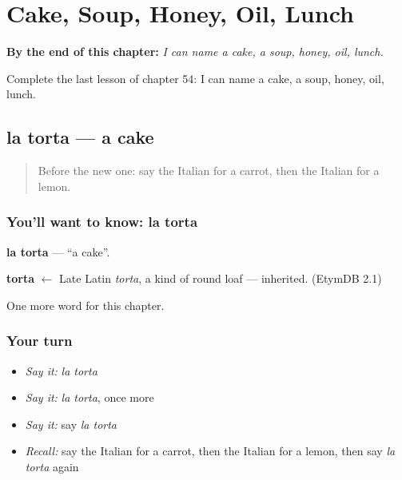 
\chapter{Cake, Soup, Honey, Oil, Lunch}
\label{ch:it-cake-soup-honey-oil-lunch}

\begin{chapteropening}
\textbf{By the end of this chapter:} \emph{I can name a cake, a soup, honey, oil, lunch.}

Complete the last lesson of chapter 54: I can name a cake, a soup, honey, oil, lunch.
\end{chapteropening}

\section[la torta]{la torta — a cake}

\label{lesson:IT-C54-torta}



\begin{quote}
Before the new one: say the Italian for a carrot, then the Italian for a lemon.
\end{quote}

\subsection*{You'll want to know: la torta}
\textbf{la torta} — \textquotedblleft{}a cake\textquotedblright{}.

\begin{cousinweb}
\textbf{torta} $\leftarrow$ Late Latin \emph{torta}, a kind of round loaf — inherited. (EtymDB 2.1)
\end{cousinweb}

\begin{grammarlens}[title={What you've built}]
One more word for this chapter.
\end{grammarlens}

\subsection*{Your turn}
\begin{itemize}
\raggedright
  \item \emph{Say it:} \emph{la torta}
  \item \emph{Say it:} \emph{la torta}, once more
  \item \emph{Say it:} say \emph{la torta}
  \item \emph{Recall:} say the Italian for a carrot, then the Italian for a lemon, then say \emph{la torta} again
\end{itemize}

